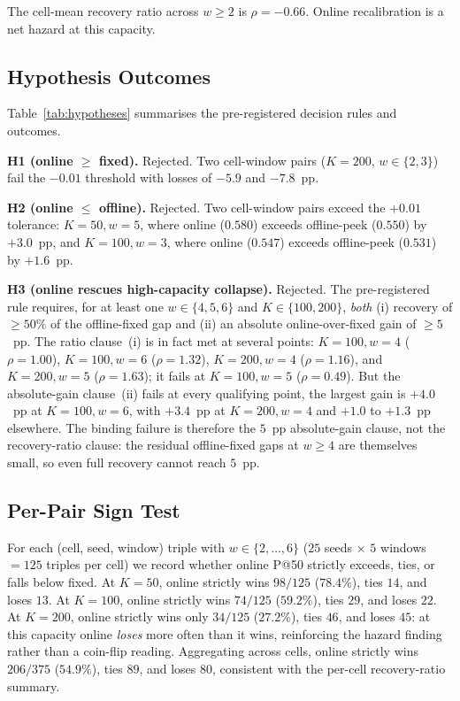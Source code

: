 The cell-mean recovery ratio across $w \geq 2$ is $\rho = -0.66$.
Online recalibration is a net hazard at this capacity.

\subsection{Hypothesis Outcomes}

Table~\ref{tab:hypotheses} summarises the pre-registered decision
rules and outcomes.



\textbf{H1 (online $\geq$ fixed).} Rejected. Two cell-window pairs
($K=200$, $w \in \{2, 3\}$) fail the $-0.01$ threshold with losses of
$-5.9$ and $-7.8$~pp.

\textbf{H2 (online $\leq$ offline).} Rejected. Two cell-window pairs
exceed the $+0.01$ tolerance: $K = 50, w = 5$, where online ($0.580$)
exceeds offline-peek ($0.550$) by $+3.0$~pp, and $K = 100, w = 3$,
where online ($0.547$) exceeds offline-peek ($0.531$) by $+1.6$~pp.

\textbf{H3 (online rescues high-capacity collapse).} Rejected. The
pre-registered rule requires, for at least one $w \in \{4, 5, 6\}$
and $K \in \{100, 200\}$, \textit{both} (i) recovery of $\geq 50\%$
of the offline-fixed gap and (ii) an absolute online-over-fixed gain
of $\geq 5$~pp. The ratio clause~(i) is in fact met at several
points: $K = 100, w = 4$ ($\rho = 1.00$), $K = 100, w = 6$
($\rho = 1.32$), $K = 200, w = 4$ ($\rho = 1.16$), and
$K = 200, w = 5$ ($\rho = 1.63$); it fails at
$K = 100, w = 5$ ($\rho = 0.49$). But the absolute-gain clause~(ii)
fails at every qualifying point, the largest gain is $+4.0$~pp at
$K = 100, w = 6$, with $+3.4$~pp at $K = 200, w = 4$ and $+1.0$ to
$+1.3$~pp elsewhere. The binding failure is therefore the $5$~pp
absolute-gain clause, not the recovery-ratio clause: the residual
offline-fixed gaps at $w \geq 4$ are themselves small, so even full
recovery cannot reach $5$~pp.

\subsection{Per-Pair Sign Test}

For each (cell, seed, window) triple with $w \in \{2, \ldots, 6\}$
($25$ seeds $\times$ $5$ windows $= 125$ triples per cell) we record
whether online P@50 strictly exceeds, ties, or falls below fixed.
At $K = 50$, online strictly wins $98/125$ ($78.4\%$), ties $14$,
and loses $13$. At $K = 100$, online strictly wins $74/125$
($59.2\%$), ties $29$, and loses $22$. At $K = 200$, online strictly
wins only $34/125$ ($27.2\%$), ties $46$, and loses $45$: at this
capacity online \textit{loses} more often than it wins, reinforcing
the hazard finding rather than a coin-flip reading. Aggregating
across cells, online strictly wins $206/375$ ($54.9\%$), ties $89$,
and loses $80$, consistent with the per-cell recovery-ratio summary.

